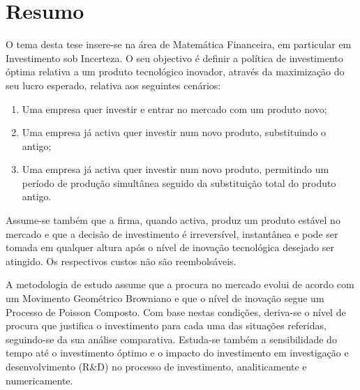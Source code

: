 
\section*{Resumo}



O tema desta tese insere-se na área de Matemática Financeira, em particular em Investimento sob Incerteza. O seu objectivo é definir a política de investimento óptima relativa a um produto tecnológico inovador, através da maximização do seu lucro esperado,
relativa aos seguintes cenários:
\begin{enumerate}
	\item Uma empresa quer investir e entrar no mercado com um produto novo;
	\item Uma empresa já activa quer investir num novo produto, substituindo o antigo; 
	\item Uma empresa já activa quer investir num novo produto, permitindo um período de produção simultânea seguido da substituição total do produto antigo.
\end{enumerate}

Assume-se também que a firma, quando activa, produz um produto estável no mercado e que a decisão de investimento é irreversível, instantânea e pode ser tomada em qualquer altura após o nível de inovação tecnológica desejado ser atingido. Os respectivos custos não são reembolsáveis.

A metodologia de estudo assume que a procura no mercado
evolui de acordo com um Movimento Geométrico Browniano e que o nível de inovação segue um Processo de Poisson Composto. Com base nestas condições, deriva-se o nível de procura que justifica o investimento para cada uma das situações referidas, seguindo-se da sua análise comparativa. Estuda-se também a sensibilidade do tempo até o investimento óptimo e o impacto do investimento em investigação e desenvolvimento (R\&D) no processo de investimento, analiticamente e numericamente.

